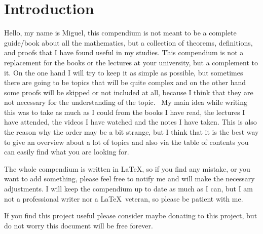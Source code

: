 \newpage
\section{Introduction}

Hello, my name is Miguel, this compendium is not meant to be a complete 
guide/book about all the mathematics,
but a collection of theorems, definitions, and proofs that I have found useful in my studies.
This compendium is not a replacement for the books or the lectures at your university, but a complement to it.
On the one hand I will try to keep it as simple as possible, but sometimes there are going to be topics 
that will be quite 
complex and on the other hand some proofs will be 
skipped or not included at all, because I think that they 
are not necessary for the understanding of the topic.
\vspace{\baselineskip}
\
My main idea while writing this was to take as much as I could from the books I have read, the lectures 
I have attended, the videos I have watched 
and the notes I have taken. This is also the reason why the order may be a bit strange, 
but I think that it is the best way to give an overview about a lot of topics and also 
via the table of contents you can
easily find what you are looking for.
\vspace{\baselineskip}

The whole compendium is written in \LaTeX, so if you find any mistake, or you want to add something, please 
feel free to notify me and will make the necessary adjustments.
I will keep the compendium up to date as much as 
I can, but I am not a professional writer nor a \LaTeX\ veteran, so please be patient with me.
\vspace{\baselineskip}

If you find this project useful please consider maybe donating
to this project, but do not worry this document will be free forever.
